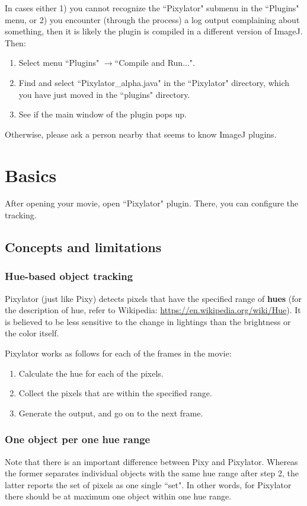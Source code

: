\documentclass[a4paper,oneside,10pt]{article}
\newcommand{\submenu}{\begin{math}\rightarrow\end{math}}
\begin{document}
In cases either 1) you cannot recognize the ``Pixylator" submenu in the ``Plugins" menu, or 2) you encounter (through the process) a log output complaining about something, then it is likely the plugin is compiled in a different version of ImageJ. Then:

\begin{enumerate}
\item Select menu ``Plugins" \submenu ``Compile and Run...".
\item Find and select ``Pixylator\_alpha.java" in the ``Pixylator" directory, which you have just moved in the ``plugins" directory.
\item See if the main window of the plugin pops up.
\end{enumerate}

Otherwise, please ask a person nearby that seems to know ImageJ plugins.



\section{Basics}
After opening your movie, open ``Pixylator" plugin. There, you can configure the tracking.

\subsection{Concepts and limitations}

\subsubsection{Hue-based object tracking}
Pixylator (just like Pixy) detects pixels that have the specified range of {\bf hues} (for the description of hue, refer to Wikipedia: \url{https://en.wikipedia.org/wiki/Hue}). It is believed to be less sensitive to the change in lightings than the brightness or the color itself.

Pixylator works as follows for each of the frames in the movie:
\begin{enumerate}
\item Calculate the hue for each of the pixels.
\item Collect the pixels that are within the specified range.
\item Generate the output, and go on to the next frame.
\end{enumerate}

\subsubsection{One object per one hue range}
Note that there is an important difference between Pixy and Pixylator. Whereas the former separates individual objects with the same hue range after step 2, the latter reports the set of pixels as one single ``set". In other words, for Pixylator there should be at maximum one object within one hue range.
\end{document}

